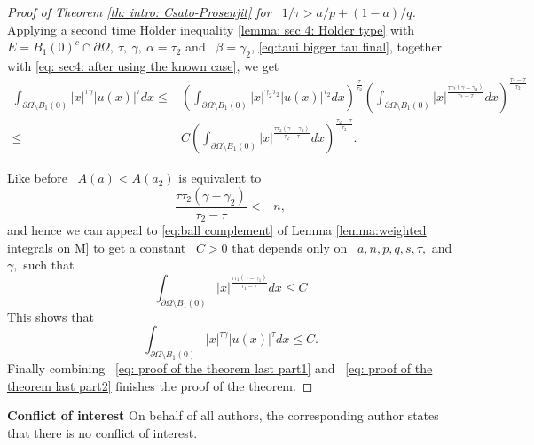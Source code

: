 \documentclass[reqno,12pt]{amsart}
\numberwithin{equation}{section}
\theoremstyle{plain}
\theoremstyle{definition}
\renewcommand{\leq}{\leqslant}
\begin{document}
\begin{proof}[Proof of Theorem \ref{th: intro: Csato-Prosenjit} for ~$1/\tau>a/p+(1-a)/q$]
Applying a second time H\"older inequality \eqref{lemma: sec 4: Holder type} with ~$E={ B_1(0)^c \cap \partial\Omega}, ~\tau, ~\gamma,
 ~\alpha = \tau_2$ and ~$\beta = \gamma_2$, \eqref{eq:taui bigger tau final}, together with \eqref{eq: sec4: after using the known case},
 we get 
 \begin{align*}
     \label{eq: proof of the theorem last part} 
     \int_{\partial\Omega\setminus B_1(0)}|x|^{\tau\gamma}|u(x)|^\tau dx
     \leq  &
     \left( \int_{\partial\Omega\setminus B_1(0)} |x|^{\gamma_2\tau_2}|u(x)|^{\tau_2}dx\right)^{\frac{\tau}{\tau_2}} 
     \left( \int_{\partial\Omega\setminus B_1(0)}|x|^{\frac{\tau\tau_2(\gamma - \gamma_2)}{\tau_2 -\tau}}dx\right)^{\frac{\tau_2 -\tau}{\tau_2}}
      \\
     \leq  &C\left( \int_{\partial\Omega\setminus B_1(0)}|x|^{\frac{\tau\tau_2(\gamma - \gamma_2)}{\tau_2 -\tau}}dx\right)^{\frac{\tau_2 -\tau}{\tau_2}}.
 \end{align*}
 

 Like before ~$A(a) < A(a_2)$ is equivalent to 
 $$
   \frac{\tau\tau_2(\gamma - \gamma_2)}{\tau_2 -\tau} < -n,
 $$
 and hence we can appeal to  \eqref{eq:ball complement} of Lemma \ref{lemma:weighted integrals on M} to get a constant ~$C >0$ that depends only on ~$a,n,p,q,s,\tau,$ and $\gamma,$ such that 
 $$\int_{\partial\Omega\setminus B_1(0)}|x|^{\frac{\tau\tau_1(\gamma - \gamma_1)}{\tau_1 -\tau}}dx \leq C$$
This shows that
\begin{equation}
    \label{eq: proof of the theorem last part2} 
     \int_{\partial\Omega\setminus B_1(0)}|x|^{\tau\gamma}|u(x)|^\tau dx \leq C.
\end{equation}
Finally combining ~\eqref{eq: proof of the theorem last part1} and  ~\eqref{eq: proof of the theorem last part2} finishes the proof of the theorem.
\end{proof}


\bigskip

\noindent
\textbf{Conflict of interest} On behalf of all authors, the corresponding author states that there is no conflict of interest.
\end{document}
